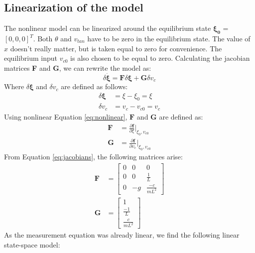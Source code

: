 \documentclass[a4paper,kul]{kulakarticle} %
\begin{document}
\subsection{Linearization of the model}
The nonlinear model can be linearized around the equilibrium state $\mathbf{\xi_0}$ = $[0,0,0]^T$. Both $\theta$ and $v_{tan}$ have to be zero in the equilibrium state. The value of $x$ doesn't really matter, but is taken equal to zero for convenience. The equilibrium input $v_{c0}$ is also chosen to be equal to zero. Calculating the jacobian matrices \textbf{F} and \textbf{G}, we can rewrite the model as:
\begin{equation}
	\delta\mathbf{\dot{\xi}} = \mathbf{F}\delta\mathbf{\xi} + \mathbf{G}\delta v_c
\end{equation}
Where $\delta\mathbf{\xi}$ and $\delta v_c$ are defined as follows:
\begin{equation}
	\begin{split}
	\delta\mathbf{\xi} &= \xi - \xi_0 = \xi \\
	\delta v_c &= v_c - v_{c0} = v_c
	\end{split}
\end{equation}
Using nonlinear Equation \ref{eq:nonlinear}, $\mathbf{F}$ and $\mathbf{G}$ are defined as: 
\begin{equation}
	\begin{split}
	\mathbf{F} &= \frac{\partial \mathbf{f}}{\partial \xi}\Bigr|_{\xi_0, v_{c0}}\\
	\mathbf{G} &= \frac{\partial \mathbf{f}}{\partial v_{c}}\Bigr|_{\xi_0, v_{c0}}
	\end{split}	
	\label{eq:jacobians}
\end{equation}
From Equation \ref{eq:jacobians}, the following matrices arise:
\begin{equation}
	\begin{split}
		\mathbf{F} &= \begin{bmatrix}
			0&0&0\\0&0&\frac{1}{L}\\0&-g&\frac{-c}{mL^2}
		\end{bmatrix}\\
		\mathbf{G} &= \begin{bmatrix}
			1\\\frac{-1}{L}\\\frac{c}{mL^2}
		\end{bmatrix}
	\end{split}
\end{equation}
 As the measurement equation was already linear, we find the following linear state-space model:
\end{document}
